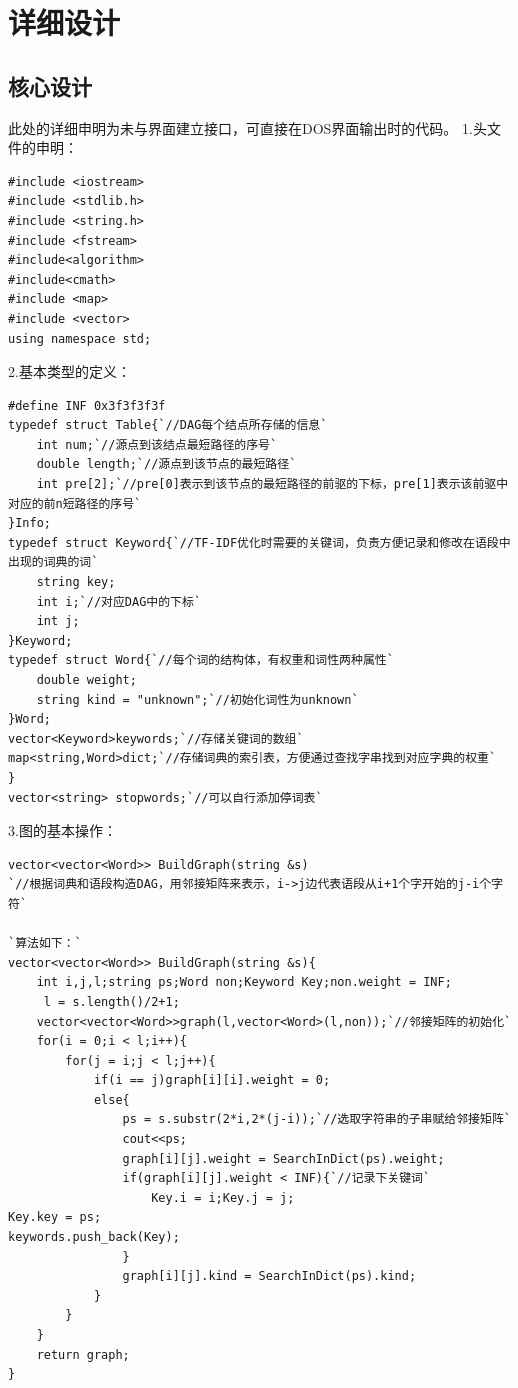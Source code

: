 \documentclass[UTF8]{ctexart}
\begin{document}
\section{详细设计}
\subsection{核心设计}
此处的详细申明为未与界面建立接口，可直接在DOS界面输出时的代码。
1.头文件的申明：\par
\begin{lstlisting}
#include <iostream>
#include <stdlib.h>
#include <string.h>
#include <fstream>
#include<algorithm>
#include<cmath>
#include <map>
#include <vector>
using namespace std;
\end{lstlisting}
2.基本类型的定义：\par
\begin{lstlisting}
#define INF 0x3f3f3f3f
typedef struct Table{`//DAG每个结点所存储的信息`
    int num;`//源点到该结点最短路径的序号`
    double length;`//源点到该节点的最短路径`
    int pre[2];`//pre[0]表示到该节点的最短路径的前驱的下标，pre[1]表示该前驱中对应的前n短路径的序号`
}Info;
typedef struct Keyword{`//TF-IDF优化时需要的关键词，负责方便记录和修改在语段中出现的词典的词`
    string key;
    int i;`//对应DAG中的下标`
    int j;
}Keyword;
typedef struct Word{`//每个词的结构体，有权重和词性两种属性`
    double weight;
    string kind = "unknown";`//初始化词性为unknown`
}Word;
vector<Keyword>keywords;`//存储关键词的数组`
map<string,Word>dict;`//存储词典的索引表，方便通过查找字串找到对应字典的权重`
}
vector<string> stopwords;`//可以自行添加停词表`
\end{lstlisting}
3.图的基本操作：\par
\begin{lstlisting}
vector<vector<Word>> BuildGraph(string &s)
`//根据词典和语段构造DAG，用邻接矩阵来表示，i->j边代表语段从i+1个字开始的j-i个字符`

`算法如下：`
vector<vector<Word>> BuildGraph(string &s){
    int i,j,l;string ps;Word non;Keyword Key;non.weight = INF;
	 l = s.length()/2+1;
    vector<vector<Word>>graph(l,vector<Word>(l,non));`//邻接矩阵的初始化`
    for(i = 0;i < l;i++){
        for(j = i;j < l;j++){
            if(i == j)graph[i][i].weight = 0;
            else{
                ps = s.substr(2*i,2*(j-i));`//选取字符串的子串赋给邻接矩阵`
                cout<<ps;
                graph[i][j].weight = SearchInDict(ps).weight;
                if(graph[i][j].weight < INF){`//记录下关键词`
                    Key.i = i;Key.j = j;
Key.key = ps;
keywords.push_back(Key);
                }
                graph[i][j].kind = SearchInDict(ps).kind;
            }
        }
    }
    return graph;
}
\end{lstlisting}
\end{document}
